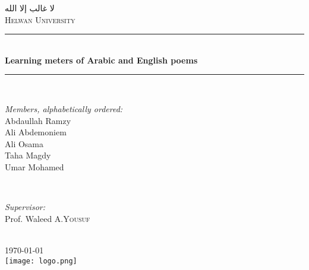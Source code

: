 \documentclass[12pt]{article}
\begin{document}
\begin{titlepage}

\newcommand{\HRule}{\rule{\linewidth}{0.5mm}} %

\center %
 

\textsc{\Large \textarabic{لا غالب إلا الله}}\\[1.5cm] %
\textsc{\LARGE Helwan University}\\[1.5cm] %


\HRule \\[0.4cm]
{ \LARGE \bfseries Learning meters of Arabic and English poems}\\[0.4cm] %
\HRule \\[1.5cm]
 

\begin{minipage}{0.4\textwidth}
\begin{flushleft} \large
\emph{Members, \textit{\small alphabetically ordered}:}\\

\small{Abdaullah Ramzy}\\
\small{Ali Abdemoniem}\\
\small{Ali Osama}\\
\small{Taha Magdy}\\
\small{Umar Mohamed}\\
\end{flushleft}
\end{minipage}
~
\begin{minipage}{0.4\textwidth}
\begin{flushright} \large
\emph{Supervisor:} \\
Prof. Waleed A.\textsc{Yousuf} %
\end{flushright}
\end{minipage}\\[2cm]



{\large \today}\\[2cm] %

\texttt{[image: logo.png]}\\[1cm] %

\vfill %

\end{titlepage}
\end{document}
